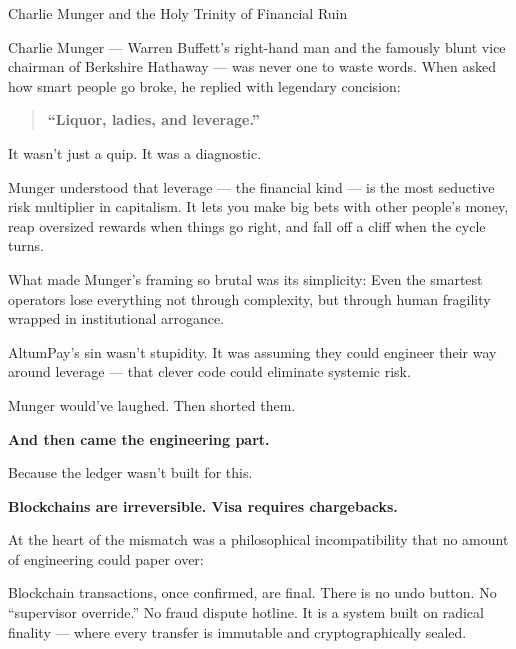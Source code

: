 \begin{HistoricalSidebar}{Charlie Munger and the Holy Trinity of Financial Ruin}

    Charlie Munger --- Warren Buffett’s right-hand man and the famously blunt vice chairman of Berkshire Hathaway --- was never one to waste words. When asked how smart people go broke, he replied with legendary concision:
    
    \begin{quote}
    \textbf{“Liquor, ladies, and leverage.”}
    \end{quote}
    
    It wasn’t just a quip. It was a diagnostic.

    \medskip
    
    Munger understood that leverage --- the financial kind --- is the most seductive risk multiplier in capitalism. It lets you make big bets with other people’s money, reap oversized rewards when things go right, and fall off a cliff when the cycle turns.

    \medskip
    
    What made Munger’s framing so brutal was its simplicity:  
    Even the smartest operators lose everything not through complexity, but through human fragility wrapped in institutional arrogance.
    
    \medskip
    
    AltumPay’s sin wasn’t stupidity.  
    It was assuming they could engineer their way around leverage --- that clever code could eliminate systemic risk.
    
    \medskip
    
    Munger would’ve laughed.  
    Then shorted them.

\end{HistoricalSidebar}


\bigskip

\textbf{And then came the engineering part.}  

Because the ledger wasn’t built for this.

\textbf{Blockchains are irreversible. Visa requires chargebacks.}

At the heart of the mismatch was a philosophical incompatibility that no amount of engineering could paper over:

Blockchain transactions, once confirmed, are final.  
There is no undo button. No “supervisor override.” No fraud dispute hotline.  
It is a system built on radical finality — where every transfer is immutable and cryptographically sealed.

